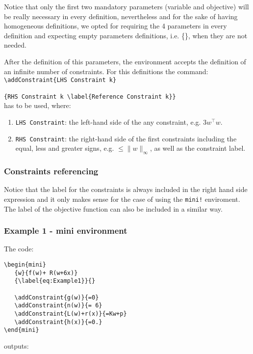 \documentclass[]{report}
\begin{document}
\noindent Notice that only the first two mandatory parameters (variable and objective) will be really necessary in every definition, nevertheless and for the sake of having homogeneous definitions, we opted for requiring the 4 parameters in every definition and expecting empty parameters definitions, i.e. \{\}, when they are not needed.


After the definition of this parameters, the environment accepts the definition of an infinite number of constraints. For this definitions the command:
~\\

\verb|\addConstraint{LHS Constraint k}|

\verb|{RHS Constraint k \label{Reference Constraint k}}| 
~\\

\noindent has to be used, where:
\begin{enumerate}
	\item \verb|LHS Constraint|: the left-hand side of the any constraint, e.g. $3w^\top w$.
	\item \verb|RHS Constraint|: the right-hand side of the first constraints including the equal, less and greater signs, e.g. $\leq \|w\|_\infty$, as well as the constraint label.
\end{enumerate}

\subsubsection{Constraints referencing}
Notice that the label for the constraints is always included in the right hand side expression and it only makes sense for the case of using the \verb|mini!| enviroment. The label of the objective function can also be included in a similar way.

\subsubsection{Example 1 - mini environment}
The code:

\begin{verbatim}
\begin{mini}
   {w}{f(w)+ R(w+6x)}
   {\label{eq:Example1}}{}
   
   \addConstraint{g(w)}{=0} 
   \addConstraint{n(w)}{= 6}
   \addConstraint{L(w)+r(x)}{=Kw+p}
   \addConstraint{h(x)}{=0.}
\end{mini}
\end{verbatim}

\noindent outputs:
\end{document}
